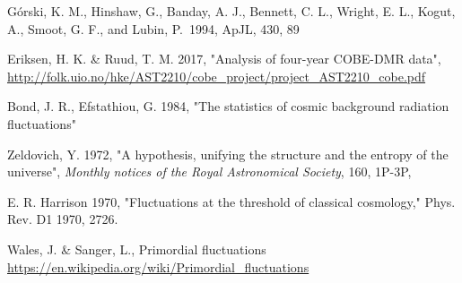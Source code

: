 \documentclass{emulateapj}
\begin{document}
\begin{thebibliography}{}

 G{\'o}rski, K. M.,
  Hinshaw, G., Banday, A. J., Bennett, C. L., Wright, E. L., Kogut,
  A., Smoot, G. F., and Lubin, P.\ 1994, ApJL, 430, 89

Eriksen, H. K. \& Ruud, T. M. 2017, "Analysis of four-year COBE-DMR data", \url{http://folk.uio.no/hke/AST2210/cobe_project/project_AST2210_cobe.pdf}

 Bond, J. R., Efstathiou, G. 1984,  "The statistics of cosmic background radiation ﬂuctuations"

Zeldovich, Y. 1972, "A hypothesis, unifying the structure and
the entropy of the universe", \textit{Monthly notices of the Royal Astronomical Society}, 160, 1P-3P, 

E. R. Harrison 1970,  "Fluctuations at the threshold of classical
cosmology," Phys. Rev. D1 1970, 2726.

Wales, J. \& Sanger, L., Primordial fluctuations \url{https://en.wikipedia.org/wiki/Primordial_fluctuations}\label{prim_fluc} %
\end{thebibliography}
\end{document}
